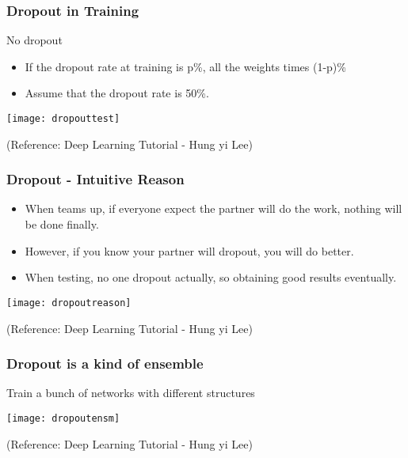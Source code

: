 \begin{frame}[fragile] \frametitle{Dropout in Training}
No dropout

\begin{itemize}
\item If the dropout rate at training is p\%, all the weights times (1-p)\%
\item Assume that the dropout rate is 50\%. 

\end{itemize}

\begin{center}
\texttt{[image: dropouttest]}
\end{center}
\tiny{(Reference:  Deep Learning Tutorial - Hung yi Lee)}
\end{frame}

\begin{frame}[fragile] \frametitle{Dropout - Intuitive Reason}
\begin{itemize}
\item When teams up, if everyone expect the partner will do the work, nothing will be done finally.
\item However, if you know your partner will dropout, you will do better.
\item When testing, no one dropout actually, so obtaining good results eventually.


\end{itemize}

\begin{center}
\texttt{[image: dropoutreason]}
\end{center}
\tiny{(Reference:  Deep Learning Tutorial - Hung yi Lee)}
\end{frame}

\begin{frame}[fragile] \frametitle{Dropout is a kind of ensemble}
Train a bunch of networks with different structures

\begin{center}
\texttt{[image: dropoutensm]}
\end{center}
\tiny{(Reference:  Deep Learning Tutorial - Hung yi Lee)}
\end{frame}





